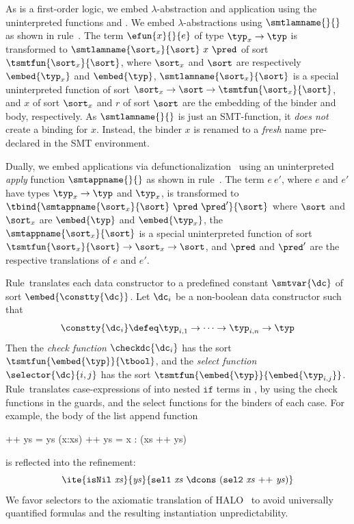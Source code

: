 %
As \smtlan is a first-order logic, we
embed $\lambda$-abstraction and application
using the uninterpreted functions
\smtlamname{}{} and \smtappname{}{}.
%
We embed $\lambda$-abstractions
using $\smtlamname{}{}$ as shown in rule~\lgfun.
%
The term $\efun{x}{}{e}$ of type
${\typ_x \rightarrow \typ}$ is transformed
to
${\smtlamname{\sort_x}{\sort}\ x\ \pred}$
of sort
${\tsmtfun{\sort_x}{\sort}}$, where
%
$\sort_x$ and $\sort$ are respectively
$\embed{\typ_x}$ and $\embed{\typ}$,
%
${\smtlamname{\sort_x}{\sort}}$
is a special uninterpreted function
of sort
${\sort_x \rightarrow \sort\rightarrow\tsmtfun{\sort_x}{\sort}}$,
and
$x$ of sort $\sort_x$ and $r$ of sort $\sort$ are
the embedding of the binder and body, respectively.
%
As $\smtlamname{}{}$ is just an SMT-function,
it \emph{does not} create a binding for $x$.
%
Instead, the binder $x$ is renamed to
a \emph{fresh} name pre-declared in
the SMT environment.


%
Dually, we embed applications via
defunctionalization~\citep{Reynolds72}
using an uninterpreted \emph{apply}
function
$\smtappname{}{}$ as shown in rule~\lgapp.
%
The term ${e\ e'}$, where $e$ and $e'$ have
types ${\typ_x \rightarrow \typ}$ and $\typ_x$,
is transformed to
${\tbind{\smtappname{\sort_x}{\sort}\ \pred\ \pred'}{\sort}}$
where
%
$\sort$ and $\sort_x$ are $\embed{\typ}$ and $\embed{\typ_x}$,
the
${\smtappname{\sort_x}{\sort}}$
is a special uninterpreted function of sort
${\tsmtfun{\sort_x}{\sort} \rightarrow \sort_x \rightarrow \sort}$,
and
$\pred$ and $\pred'$ are the respective translations of $e$ and $e'$.


%
Rule~\lgdc translates each data constructor to a
predefined \smtlan constant ${\smtvar{\dc}}$ of
sort ${\embed{\constty{\dc}}}$.
%
Let $\dc_i$ be a non-boolean data constructor such that
$$
\constty{\dc_i} \defeq \typ_{i,1} \rightarrow \dots \rightarrow \typ_{i,n} \rightarrow \typ
$$
Then the \emph{check function}
${\checkdc{{\dc_i}}}$ has the sort
$\tsmtfun{\embed{\typ}}{\tbool}$,
and the \emph{select function}
${\selector{\dc}{i,j}}$ has the sort
$\tsmtfun{\embed{\typ}}{\embed{\typ_{i,j}}}$.
%
Rule~\lgcase translates case-expressions
of \corelan into nested $\mathtt{if}$
terms in \smtlan, by using the check
functions in the guards, and the
select functions for the binders
of each case.
%
%
%
For example, the body of the list append function
%
\begin{code}
  []     ++ ys = ys
  (x:xs) ++ ys = x : (xs ++ ys)
\end{code}
%
is reflected into the \smtlan refinement:
%
$$
\ite{\mathtt{isNil}\ \mathit{xs}}
    {\mathit{ys}}
    {\mathtt{sel1}\ \mathit{xs}\
       \dcons\
       (\mathtt{sel2}\ \mathit{xs} \ \mathtt{++}\  \mathit{ys})}
$$
%
We favor selectors to the axiomatic translation of
HALO~\citep{HALO} to avoid
universally quantified formulas and the resulting
instantiation unpredictability.

